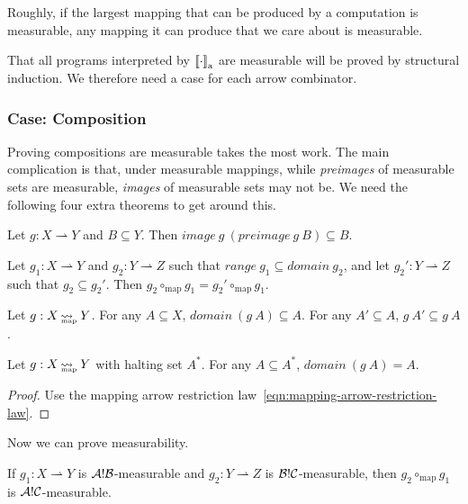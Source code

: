 \documentclass[preprint]{sigplanconf}
\newcommand{\arrow}{\rightsquigarrow}
\newcommand{\pto}{\rightharpoonup}
\newcommand{\gen}{_\mathrm{a}}
\newcommand{\map}{_\mathrm{map}}
\DeclareMathOperator{\mapto}{\arrow_{\mspace{-21mu}\map}}
\begin{document}
Roughly, if the largest mapping that can be produced by a computation is measurable, any mapping it can produce that we care about is measurable.

That all programs interpreted by $\meaningof{\cdot}\gen$ are measurable will be proved by structural induction.
We therefore need a case for each arrow combinator.

\subsubsection{Case: Composition}

Proving compositions are measurable takes the most work.
The main complication is that, under measurable mappings, while \emph{preimages} of measurable sets are measurable, \emph{images} of measurable sets may not be.
We need the following four extra theorems to get around this.

\begin{lemma}
Let $g : X \pto Y$ and $B \subseteq Y$. Then $image~g~(preimage~g~B) \subseteq B$.
\label{lem:images-of-preimages}
\end{lemma}

\begin{lemma}
Let $g_1 : X \pto Y$ and $g_2 : Y \pto Z$ such that $range~g_1 \subseteq domain~g_2$, and let $g_2' : Y \pto Z$ such that $g_2 \subseteq g_2'$.
Then $g_2 \circ\map g_1 = g_2' \circ\map g_1$.
\label{lem:composition-expansion}
\end{lemma}

\begin{theorem}
Let $g : X \mapto Y$.
For any $A \subseteq X$, $domain~(g~A) \subseteq A$.
For any $A' \subseteq A$, $g~A' \subseteq g~A$.
\label{thm:mapping-arrow-monotonicity}
\end{theorem}
\begin{theorem}
Let $g : X \mapto Y$ with halting set $A^*$. For any $A \subseteq A^*$, $domain~(g~A) = A$.
\label{thm:halting-subsets}
\end{theorem}
\begin{proof}
Use the mapping arrow restriction law~\eqref{eqn:mapping-arrow-restriction-law}.
\end{proof}

Now we can prove measurability.

\begin{lemma}[measurability under $\circ\map$]
If $g_1 : X \pto Y$ is $\mathcal{A}!\mathcal{B}$-measurable and $g_2 : Y \pto Z$ is $\mathcal{B}!\mathcal{C}$-measurable, then $g_2 \circ\map g_1$ is $\mathcal{A}!\mathcal{C}$-measurable.
\label{lem:compositions-are-measurable}
\end{lemma}
\end{document}
